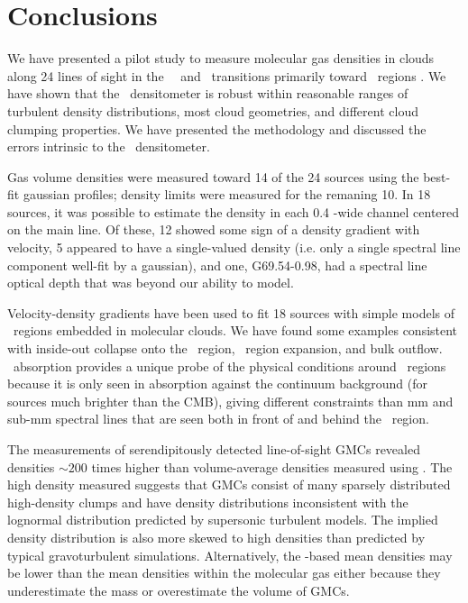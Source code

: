 

\section{Conclusions}
\label{sec:h2coconclusions}
We have presented a pilot study to measure molecular gas densities in clouds
along 24 lines of sight in the \formaldehyde\ \oneone\ and \twotwo\ transitions
primarily toward \uchii\ regions .  We have shown that the \formaldehyde\
densitometer is robust within reasonable ranges of turbulent density
distributions, most cloud geometries, and different cloud clumping properties.
We have presented the methodology and discussed the errors intrinsic to the
\formaldehyde\ densitometer.

Gas volume densities were measured toward 14 of the 24 sources using the
best-fit gaussian profiles; density limits were measured for the remaning 10.
In 18 sources, it was possible to estimate the density in each 0.4 \kms-wide
channel centered on the main line.  Of these, 12 showed some sign of a density
gradient with velocity, 5 appeared to have a single-valued density (i.e. only a
single spectral line component well-fit by a gaussian), and one, G69.54-0.98,
had a spectral line optical depth that was beyond our ability to model.  

Velocity-density gradients have been used to fit 18 sources with simple
models of \uchii\ regions embedded in molecular clouds.  We have found some  
examples consistent with inside-out collapse onto the \uchii\ region,
 \uchii\ region expansion, and bulk outflow.  \formaldehyde\
absorption provides a unique probe of the physical conditions around \uchii\
regions because it is only seen in absorption against the continuum background
(for sources much brighter than the CMB), giving different constraints than mm
and sub-mm spectral lines that are seen both in front of and behind the \uchii\ region.

The measurements of serendipitously detected line-of-sight GMCs revealed
densities $\sim200$ times higher than volume-average densities measured using
\thirteenco.  The high density measured suggests that GMCs consist of many
sparsely distributed high-density clumps and have density distributions
inconsistent with the lognormal distribution predicted by supersonic turbulent
models.  The implied density distribution is also more skewed to high densities
than predicted by typical gravoturbulent simulations.  Alternatively, the 
\thirteenco-based mean densities may be lower than the mean densities within
the molecular gas either because they underestimate the mass or overestimate
the volume of GMCs.

